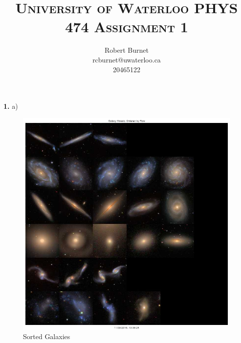 \documentclass[10pt,letterpaper]{article}
\begin{document}
\title{\scshape\LARGE University of Waterloo \vfill \huge\bfseries PHYS 474 Assignment 1 \vfill}
\author{Robert Burnet \\ rcburnet@uwaterloo.ca \\ 20465122 }
\maketitle

\newpage

\textbf{1.} a)
\begin{figure}[h!]
\center
\caption{Sorted Galaxies}\label{fig: Sorted Galaxies}
\includegraphics[scale=0.4]{figures/galaxy_order_revised.jpg}
\end{figure}
\end{document}
